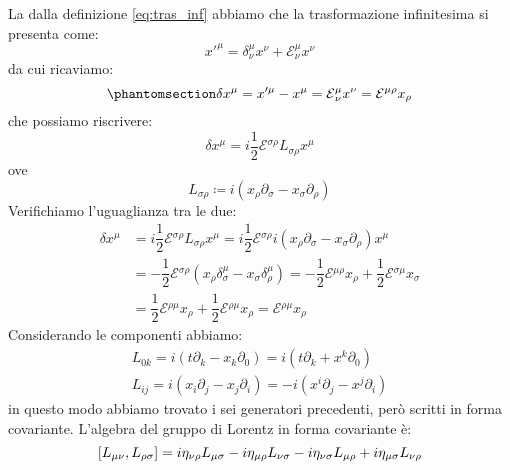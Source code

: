 La dalla definizione \eqref{eq:tras_inf} abbiamo che la  trasformazione infinitesima si presenta come:
\begin{equation}
 x'^\mu=\delta{^\mu_\nu}x^\nu+\mathcal{E}{^\mu_\nu}x^\nu
\end{equation}
da cui ricaviamo:
\begin{equation}\phantomsection\label{eq:diff_tras}
 \delta x^\mu=x'^\mu-x^\mu=\mathcal{E}{^\mu_\nu}x^\nu=\mathcal{E}{^{\mu\rho}}x_\rho
\end{equation}
che possiamo riscrivere:
\begin{equation}
 \delta x^\mu=i\dfrac{1}{2}\mathcal{E}{^{\sigma\rho}}L{_{\sigma\rho}}x^\mu
\end{equation}
ove
\begin{equation}
 L{_{\sigma\rho}}\coloneqq i(x_\rho\partial_\sigma-x_\sigma\partial_\rho)
\end{equation}
Verifichiamo l'uguaglianza tra le due:
\begin{equation}
\begin{aligned}
 \delta x^\mu&=i\dfrac{1}{2}\mathcal{E}{^{\sigma\rho}}L{_{\sigma\rho}}x^\mu=i\dfrac{1}{2}\mathcal{E}{^{\sigma\rho}}i(x_\rho\partial_\sigma-x_\sigma\partial_\rho)x^\mu\\
 &=-\dfrac{1}{2}\mathcal{E}{^{\sigma\rho}}(x_\rho\delta^\mu_\sigma-x_\sigma\delta^\mu_\rho)=-\dfrac{1}{2}\mathcal{E}{^{\mu\rho}}x_\rho+\dfrac{1}{2}\mathcal{E}{^{\sigma\mu}}x_\sigma\\
 &=\dfrac{1}{2}\mathcal{E}{^{\rho\mu}}x_\rho+\dfrac{1}{2}\mathcal{E}{^{\rho\mu}}x_\rho=\mathcal{E}{^{\rho\mu}}x_\rho
\end{aligned}
\end{equation}
Considerando le componenti abbiamo:
\begin{equation}
\begin{gathered}
 L{_{0k}}= i(t\partial_k-x_k\partial_0)=i(t\partial_k+x^k\partial_0)\\
  L{_{ij}}= i(x_i\partial_j-x_j\partial_i)=-i(x^i\partial_j-x^j\partial_i)
\end{gathered}
\end{equation}
in questo modo abbiamo trovato i sei generatori precedenti, però scritti in forma covariante. L'algebra del gruppo di Lorentz in forma covariante è:
\begin{equation}
        \left[L_{\mu \nu},L_{\rho \sigma}\right]=i\eta_{\nu \rho}L_{\mu \sigma}-i\eta_{\mu \rho}L_{\nu \sigma}-i\eta_{\nu \sigma}L_{\mu \rho}+i\eta_{\mu \sigma}L_{\nu \rho}\\
\end{equation}

